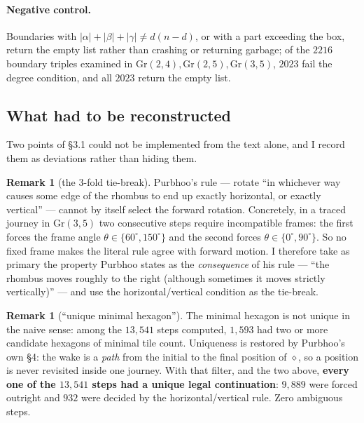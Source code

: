 \documentclass[11pt]{article}
\theoremstyle{plain}
\theoremstyle{definition}
\newtheorem{remark}[theorem]{Remark}
\begin{document}
\paragraph{Negative control.}  Boundaries with
$|\alpha|+|\beta|+|\gamma|\neq d(n-d)$, or with a part exceeding the box, return the
empty list rather than crashing or returning garbage; of the $2216$ boundary triples
examined in $\mathrm{Gr}(2,4),\mathrm{Gr}(2,5),\mathrm{Gr}(3,5)$, $2023$ fail the
degree condition, and all $2023$ return the empty list.

\subsection{What had to be reconstructed}

Two points of \S3.1 could not be implemented from the text alone, and I record them
as deviations rather than hiding them.

\begin{remark}[the $3$-fold tie-break]\label{rem:hv}
Purbhoo's rule --- rotate ``in whichever way causes some edge of the rhombus to end
up exactly horizontal, or exactly vertical'' --- cannot by itself select the forward
rotation.  Concretely, in a traced journey in $\mathrm{Gr}(3,5)$ two consecutive
steps require incompatible frames: the first forces the frame angle
$\theta\in\{60^\circ,150^\circ\}$ and the second forces
$\theta\in\{0^\circ,90^\circ\}$.  So no fixed frame makes the literal rule agree
with forward motion.  I therefore take as primary the property Purbhoo states as the
\emph{consequence} of his rule --- ``the rhombus moves roughly to the right (although
sometimes it moves strictly vertically)'' --- and use the horizontal/vertical
condition as the tie-break.
\end{remark}

\begin{remark}[``unique minimal hexagon'']\label{rem:uniq}
The minimal hexagon is not unique in the naive sense: among the $13{,}541$ steps
computed, $1{,}593$ had two or more candidate hexagons of minimal tile count.
Uniqueness is restored by Purbhoo's own \S4: the wake is a \emph{path} from the
initial to the final position of $\diamond$, so a position is never revisited inside
one journey.  With that filter, and the two above, \textbf{every one of the $13{,}541$
steps had a unique legal continuation}: $9{,}889$ were forced outright and $932$ were
decided by the horizontal/vertical rule.  Zero ambiguous steps.
\end{remark}
\end{document}

